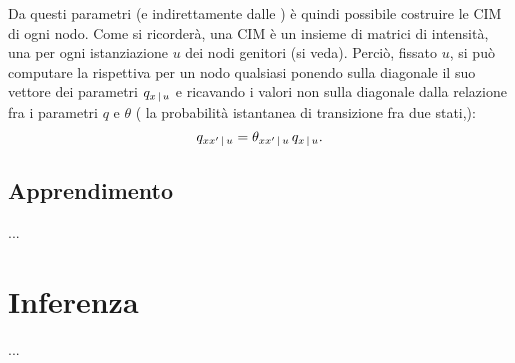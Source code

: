 Da questi parametri (e indirettamente dalle \stats{}) è quindi possibile costruire le \acl{CIM} di ogni nodo. Come si ricorderà, una \acs{CIM} è un insieme di matrici di intensità, una per ogni istanziazione $u$ dei nodi genitori (si veda). Perciò, fissato $u$, si può computare la rispettiva \im*{} per un nodo qualsiasi ponendo sulla diagonale il suo vettore dei parametri $q_{x\,\arrowvert\,u}$ e ricavando i valori non sulla diagonale dalla relazione fra i parametri $q$ e $\theta$ (\ie{} la probabilità istantanea di transizione fra due stati,):
\[
q_{xx^\prime\,\arrowvert\,u}=\theta_{xx^\prime\,\arrowvert\,u}\,q_{x\,\arrowvert\,u}\text{.}
\]

\subsection{Apprendimento}
\label{sec:ctbn-learning}
...

\section{Inferenza}
\label{sec:ctbn-inferenza}
...









